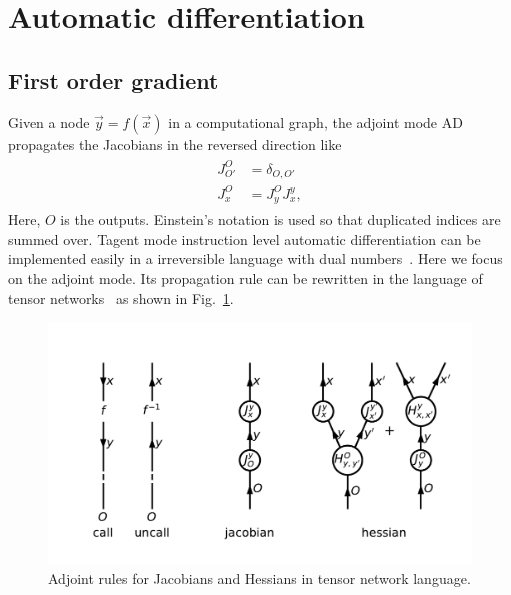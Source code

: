 \documentclass[aps,twocolumn,longbibliography,english,superscriptaddress,prr]{revtex4-1}
\newcommand{\<}{\langle}
\renewcommand{\>}{\rangle}
\newcommand{\out}{{O}}
\newcommand{\inp}{{I}}
\newcommand{\vx}{{\vec x}}
\newcommand{\vy}{{\vec y}}
\newcommand{\Fig}[1]{Fig.~\ref{#1}}
\theoremstyle{definition}\newtheorem{definition}{\textit{Definition}}
\begin{document}
\section{Automatic differentiation}\label{sec:bp}

\subsection{First order gradient}\label{sec:jacobian}
Given a node $\vec y = f(\vec x)$ in a computational graph,
the adjoint mode AD propagates the Jacobians in the reversed direction like
\begin{align}
    \begin{split}
        J^{\out}_{\out'} &= \delta_{\out,\out'}\\
        J^{\out}_{x} &= J^{\out}_{y} J^{y}_{x},
    \end{split}
\end{align}
Here, $\out$ is the outputs. Einstein's notation is used so that duplicated indices are summed over.
Tagent mode instruction level automatic differentiation can be implemented easily in a irreversible language with dual numbers~\cite{Revels2016}.
Here we focus on the adjoint mode.
Its propagation rule can be rewritten in the language of tensor networks~\cite{Orus2014} as shown in \Fig{fig:ad}.
\begin{figure}
    \centerline{\includegraphics[width=0.9\columnwidth,trim={0.5cm 1cm 0 1cm},clip]{images/ad.pdf}}
    \caption{Adjoint rules for Jacobians and Hessians in tensor network language.}\label{fig:ad}
\end{figure}
\end{document}
